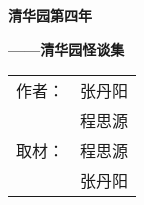 \documentclass[UTF-8,openright]{ctexbook}
\begin{document}

\begin{titlepage}
	\centering
	\linespread{1.2}
	\vspace*{1cm}
	{ \textbf{清华园第四年}\par}
	\vspace{0.5cm}
	{ \textbf{——清华园怪谈集}\par}
	\vfill
	\begin{table}[!hb]
		\LARGE
		\centering
		\begin{tabular}{rc}
			作者： &	张丹阳 \\
			&			程思源 \\
			取材： &	程思源 \\
			&			张丹阳
		\end{tabular}
		\vspace{1cm}
	\end{table}
\end{titlepage}

\pagestyle{headings}



\tableofcontents
\newpage






%


\end{document}
